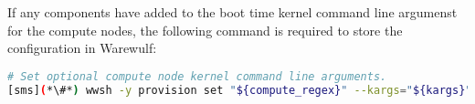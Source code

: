 \noindent If any components have added to the boot time kernel command line argumenst for the compute nodes,
the following command is required to store the configuration in Warewulf:
\begin{lstlisting}[language=bash,keywords={},upquote=true,basicstyle=\footnotesize\ttfamily]
# Set optional compute node kernel command line arguments.
[sms](*\#*) wwsh -y provision set "${compute_regex}" --kargs="${kargs}"
\end{lstlisting}
